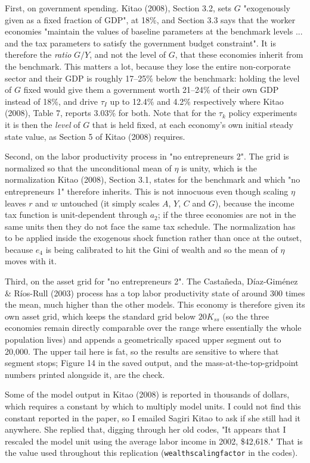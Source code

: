 \documentclass[11pt,fleqn]{article}
\begin{document}
First, on government spending. Kitao (2008), Section 3.2, sets $G$ "exogenously given as a fixed fraction of GDP", at 18\%, and Section 3.3 says that the worker economies "maintain the values of baseline parameters at the benchmark levels ... and the tax parameters to satisfy the government budget constraint". It is therefore the \emph{ratio} $G/Y$, and not the level of $G$, that these economies inherit from the benchmark. This matters a lot, because they lose the entire non-corporate sector and their GDP is roughly 17--25\% below the benchmark: holding the level of $G$ fixed would give them a government worth 21--24\% of their own GDP instead of 18\%, and drive $\tau_I$ up to 12.4\% and 4.2\% respectively where Kitao (2008), Table 7, reports 3.03\% for both. Note that for the $\tau_k$ policy experiments it is then the \emph{level} of $G$ that is held fixed, at each economy's own initial steady state value, as Section 5 of Kitao (2008) requires.

Second, on the labor productivity process in "no entrepreneurs 2". The grid is normalized so that the unconditional mean of $\eta$ is unity, which is the normalization Kitao (2008), Section 3.1, states for the benchmark and which "no entrepreneurs 1" therefore inherits. This is not innocuous even though scaling $\eta$ leaves $r$ and $w$ untouched (it simply scales $A$, $Y$, $C$ and $G$), because the income tax function is unit-dependent through $a_2$; if the three economies are not in the same units then they do not face the same tax schedule. The normalization has to be applied inside the exogenous shock function rather than once at the outset, because $e_4$ is being calibrated to hit the Gini of wealth and so the mean of $\eta$ moves with it.

Third, on the asset grid for "no entrepreneurs 2". The Castañeda, Díaz-Giménez \& Ríos-Rull (2003) process has a top labor productivity state of around 300 times the mean, much higher than the other models. This economy is therefore given its own asset grid, which keeps the standard grid below $20 K_{ss}$ (so the three economies remain directly comparable over the range where essentially the whole population lives) and appends a geometrically spaced upper segment out to 20{,}000. The upper tail here is fat, so the results are sensitive to where that segment stops; Figure 14 in the saved output, and the mass-at-the-top-gridpoint numbers printed alongside it, are the check.

Some of the model output in Kitao (2008) is reported in thousands of dollars, which requires a constant by which to multiply model units. I could not find this constant reported in the paper, so I emailed Sagiri Kitao to ask if she still had it anywhere. She replied that, digging through her old codes, "It appears that I rescaled the model unit using the average labor income in 2002, \$42,618." That is the value used throughout this replication (\texttt{wealthscalingfactor} in the codes).
\end{document}
